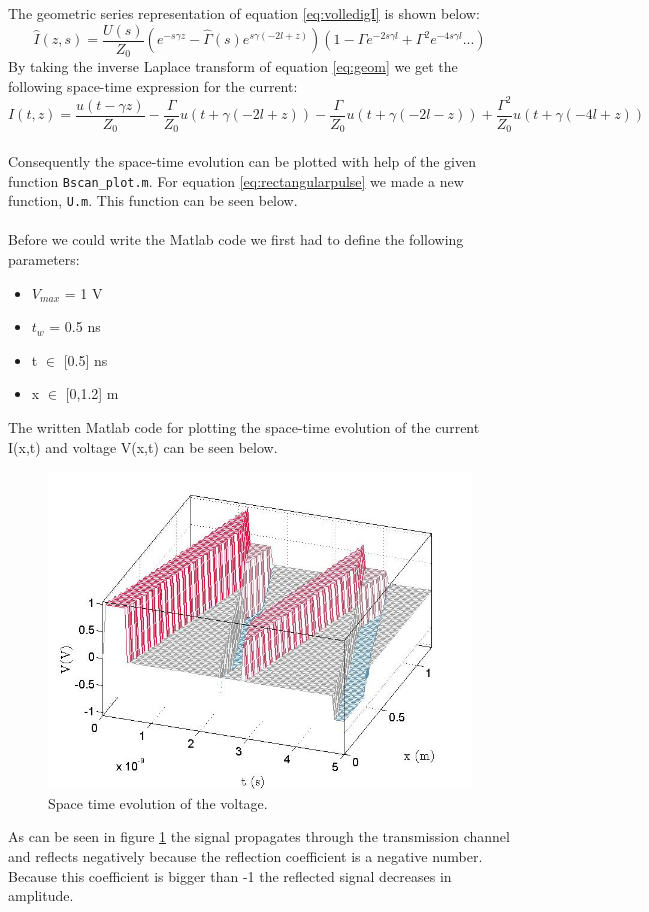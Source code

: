 \documentclass[final]{scrreprt} %
\begin{document}
The geometric series representation of equation \ref{eq:volledigI} is shown below:
\begin{equation} \label{eq:geom}
\hat{I}(z,s)= \frac{U(s)}{Z_{0}}\left(e^{-s\gamma z} - \hat{\Gamma}(s)e^{s\gamma(-2l+z)}\right)\left(1-\Gamma e^{-2s\gamma l}+\Gamma^2 e^{-4s\gamma l}...\right)
\end{equation}
By taking the inverse Laplace transform of equation \ref{eq:geom} we get the following space-time expression for the current:
\begin{equation}
I(t,z)=\frac{u(t-\gamma z)}{Z_{0}}-\frac{\Gamma}{Z_{0}}u(t+\gamma(-2l+z))-\frac{\Gamma}{Z_{0}}u(t+\gamma(-2l-z)) + \frac{\Gamma^2}{Z_{0}}u(t+\gamma(-4l+z))
\end{equation}
\\
Consequently the space-time evolution can be plotted with help of the given function \texttt{Bscan\_plot.m}. For equation \ref{eq:rectangularpulse} we made a new function, \texttt{U.m}. This function can be seen below. \\

\\
Before we could write the Matlab code we first had to define the following parameters:
\begin{itemize}
\item $V_{max}$ = 1 V
\item $t_w$ = 0.5 ns
\item t $\in$ [0.5] ns
\item x $\in$ [0,1.2] m
\end{itemize}

The written Matlab code for plotting the space-time evolution of the current I(x,t) and voltage V(x,t) can be seen below. 


\begin{figure}[H]
	\centering
	\includegraphics[width=\linewidth]{resources/task3.png}
	\caption{Space time evolution of the voltage.}
	\label{fig:space-time-voltage}
\end{figure}
As can be seen in figure \ref{fig:space-time-voltage} the signal propagates through the transmission channel and reflects negatively because the reflection coefficient is a negative number. Because this coefficient is bigger than -1 the reflected signal decreases in amplitude.
\end{document}
